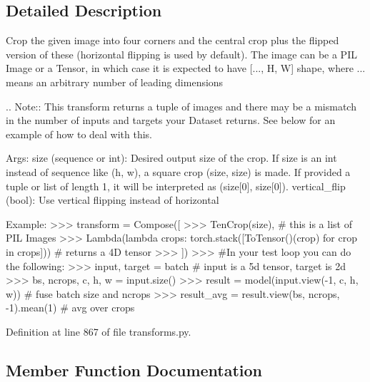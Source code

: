 \subsection{Detailed Description}
\begin{DoxyVerb}Crop the given image into four corners and the central crop plus the flipped version of
these (horizontal flipping is used by default).
The image can be a PIL Image or a Tensor, in which case it is expected
to have [..., H, W] shape, where ... means an arbitrary number of leading
dimensions

.. Note::
     This transform returns a tuple of images and there may be a mismatch in the number of
     inputs and targets your Dataset returns. See below for an example of how to deal with
     this.

Args:
    size (sequence or int): Desired output size of the crop. If size is an
        int instead of sequence like (h, w), a square crop (size, size) is
        made. If provided a tuple or list of length 1, it will be interpreted as (size[0], size[0]).
    vertical_flip (bool): Use vertical flipping instead of horizontal

Example:
     >>> transform = Compose([
     >>>    TenCrop(size), # this is a list of PIL Images
     >>>    Lambda(lambda crops: torch.stack([ToTensor()(crop) for crop in crops])) # returns a 4D tensor
     >>> ])
     >>> #In your test loop you can do the following:
     >>> input, target = batch # input is a 5d tensor, target is 2d
     >>> bs, ncrops, c, h, w = input.size()
     >>> result = model(input.view(-1, c, h, w)) # fuse batch size and ncrops
     >>> result_avg = result.view(bs, ncrops, -1).mean(1) # avg over crops
\end{DoxyVerb}
 

Definition at line 867 of file transforms.\+py.



\subsection{Member Function Documentation}
\mbox{\label{classtorchvision_1_1transforms_1_1transforms_1_1TenCrop_a53284b367d24a1bf0e407e30eebec2f4}} 
